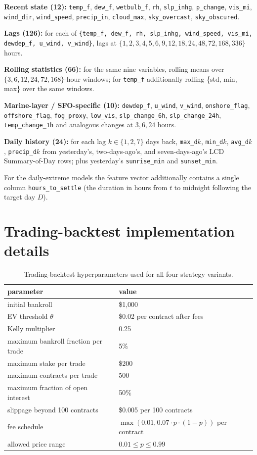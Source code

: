 \documentclass[11pt]{article}
\begin{document}
\textbf{Recent state (12):} \texttt{temp\_f}, \texttt{dew\_f},
\texttt{wetbulb\_f}, \texttt{rh}, \texttt{slp\_inhg}, \texttt{p\_change},
\texttt{vis\_mi}, \texttt{wind\_dir}, \texttt{wind\_speed},
\texttt{precip\_in}, \texttt{cloud\_max}, \texttt{sky\_overcast},
\texttt{sky\_obscured}.

\textbf{Lags (126):} for each of \texttt{\{temp\_f, dew\_f, rh, slp\_inhg,
wind\_speed, vis\_mi, dewdep\_f, u\_wind, v\_wind\}}, lags at
$\{1, 2, 3, 4, 5, 6, 9, 12, 18, 24, 48, 72, 168, 336\}$ hours.

\textbf{Rolling statistics (66):} for the same nine variables, rolling
means over $\{3, 6, 12, 24, 72, 168\}$-hour windows; for \texttt{temp\_f}
additionally rolling \{std, min, max\} over the same windows.

\textbf{Marine-layer / SFO-specific (10):} \texttt{dewdep\_f},
\texttt{u\_wind}, \texttt{v\_wind}, \texttt{onshore\_flag},
\texttt{offshore\_flag}, \texttt{fog\_proxy}, \texttt{low\_vis},
\texttt{slp\_change\_6h}, \texttt{slp\_change\_24h}, \texttt{temp\_change\_1h}
and analogous changes at $3, 6, 24$ hours.

\textbf{Daily history (24):} for each lag $k \in \{1, 2, 7\}$ days back,
\texttt{max\_d}$k$, \texttt{min\_d}$k$, \texttt{avg\_d}$k$,
\texttt{precip\_d}$k$ from yesterday's, two-days-ago's, and seven-days-ago's
LCD Summary-of-Day rows; plus yesterday's \texttt{sunrise\_min} and
\texttt{sunset\_min}.

For the daily-extreme models the feature vector additionally contains a
single column \texttt{hours\_to\_settle} (the duration in hours from $t$
to midnight following the target day $D$).

\section{Trading-backtest implementation details}
\label{app:backtest}

\begin{table}[h]
\centering
\small
\begin{tabular}{ll}
\toprule
parameter & value \\
\midrule
initial bankroll & \$1{,}000 \\
EV threshold $\theta$ & \$0.02 per contract after fees \\
Kelly multiplier & 0.25 \\
maximum bankroll fraction per trade & 5\% \\
maximum stake per trade & \$200 \\
maximum contracts per trade & 500 \\
maximum fraction of open interest & 50\% \\
slippage beyond 100 contracts & \$0.005 per 100 contracts \\
fee schedule & $\max(0.01, 0.07 \cdot p \cdot (1-p))$ per contract \\
allowed price range & $0.01 \le p \le 0.99$ \\
\bottomrule
\end{tabular}
\caption{Trading-backtest hyperparameters used for all four strategy variants.}
\end{table}
\end{document}
